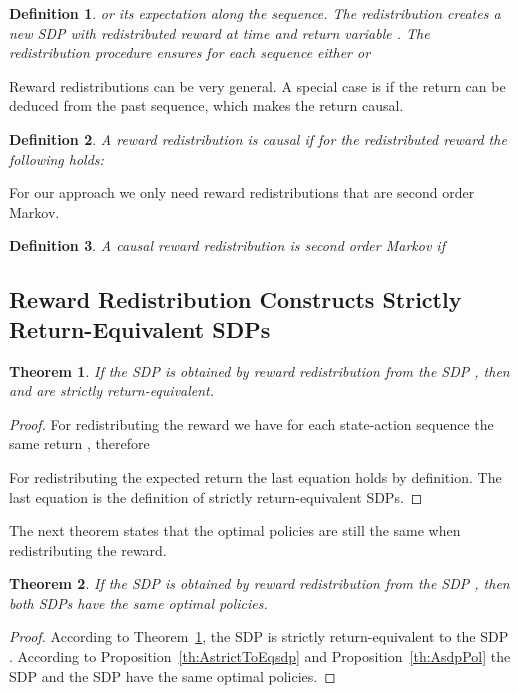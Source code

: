 \documentclass{article}
\newtheorem{theoremA}{Theorem}
\newtheorem{definitionA}{Definition}
\begin{document}
\begin{appendices}
\begin{definitionA}
or its expectation 
along the sequence. 
The redistribution creates a new SDP  with
redistributed reward  at time  and return variable
.
The redistribution procedure 
ensures for each sequence either 
or 

\end{definitionA}


Reward redistributions can be very general.
A special case is if the return can be deduced from the past sequence, 
which makes the return causal. 
\begin{definitionA}
A reward redistribution is {\em causal} if for the redistributed
reward  the following holds:

\end{definitionA}

For our approach we only need reward redistributions that are
second order Markov.
\begin{definitionA}
A causal reward redistribution is {\em second order Markov} if

\end{definitionA}



\subsection{Reward Redistribution Constructs Strictly Return-Equivalent SDPs}

\begin{theoremA}
\label{th:AsdpEquiv}
If the SDP  is obtained by reward redistribution from the 
SDP , then  and  are strictly return-equivalent.
\end{theoremA}

\begin{proof}
For redistributing the reward we have for 
each state-action sequence  the same return
, therefore  

For redistributing the expected return the last equation holds 
by definition.
The last equation is the definition of 
strictly return-equivalent SDPs.
\end{proof}

The next theorem states that the optimal policies are still the same 
when redistributing the reward.
\begin{theoremA}
\label{th:AEquivT}
If the SDP  is obtained by reward redistribution from the 
SDP , then both SDPs have the same optimal policies.
\end{theoremA}


\begin{proof}
\label{c:t1p}
According to Theorem~\ref{th:AsdpEquiv}, 
the SDP  is strictly return-equivalent to the SDP .
According to Proposition~\ref{th:AstrictToEqsdp} and Proposition~\ref{th:AsdpPol}
the SDP  and the SDP  have  
the same optimal policies. 
\end{proof}






\end{appendices}
\end{document}
